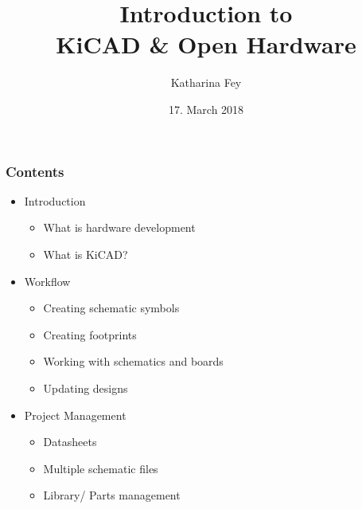 \documentclass{beamer}
\begin{document}
\title{Introduction to\\KiCAD \& Open Hardware}
\author{Katharina Fey}
\date{17. March 2018}

\frame{\titlepage}


\begin{frame}
  \frametitle{Contents}
  \begin{itemize}
    \item Introduction
    \begin{itemize}
      \item What is hardware development
      \item What is KiCAD?
    \end{itemize}
    \item Workflow
    \begin{itemize}
      \item Creating schematic symbols
      \item Creating footprints
      \item Working with schematics and boards
      \item Updating designs
    \end{itemize}
    \item Project Management
    \begin{itemize}
      \item Datasheets
      \item Multiple schematic files
      \item Library/ Parts management
    \end{itemize}
  \end{itemize}
\end{frame}
\end{document}
